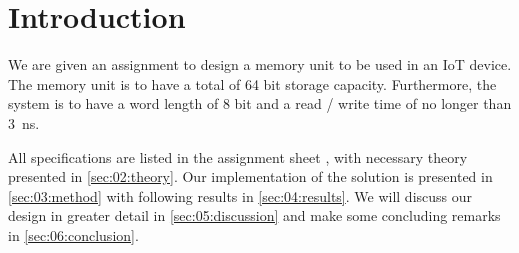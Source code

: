 \section{Introduction}
We are given an assignment to design a memory unit to be used in an IoT device. The memory unit is to have a total of 64 bit storage capacity. Furthermore, the system is to have a word length of 8 bit and a read / write time of no longer than \SI{3}{ns}.

All specifications are listed in the assignment sheet \cite{oppgavebeskrivelse}, with necessary theory presented in \autoref{sec:02:theory}. Our implementation of the solution is presented in \autoref{sec:03:method} with following results in \autoref{sec:04:results}. We will discuss our design in greater detail in \autoref{sec:05:discussion} and make some concluding remarks in \autoref{sec:06:conclusion}.